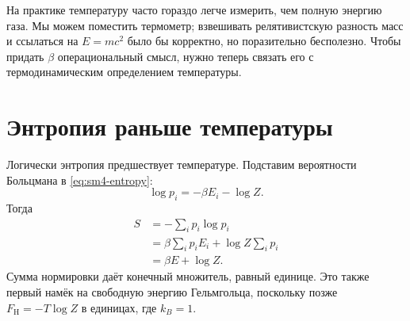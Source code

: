 \begin{classroomqa}
\end{classroomqa}

\begin{classroomqa}
\end{classroomqa}

На практике температуру часто гораздо легче измерить, чем полную энергию газа. Мы можем поместить термометр; взвешивать релятивистскую разность масс и ссылаться на \(E=mc^2\) было бы корректно, но поразительно бесполезно. Чтобы придать \(\beta\) операциональный смысл, нужно теперь связать его с термодинамическим определением температуры.

\section{Энтропия раньше температуры}

Логически энтропия предшествует температуре. Подставим вероятности Больцмана в \eqref{eq:sm4-entropy}:
\begin{equation}
 \log p_i=-\beta E_i-\log Z.
\end{equation}
Тогда
\begin{align}
 S
 &=-\sum_i p_i\log p_i\\
 &=\beta\sum_i p_iE_i+\log Z\sum_i p_i\\
 &=\beta E+\log Z.
 \label{eq:sm4-entropy-logz}
\end{align}
Сумма нормировки даёт конечный множитель, равный единице. Это также первый намёк на свободную энергию Гельмгольца, поскольку позже \(F_{\mathrm H}=-T\log Z\) в единицах, где \(k_B=1\).

